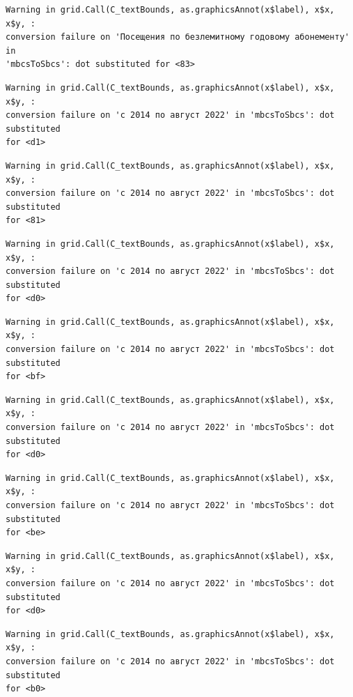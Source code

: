 \documentclass[
  letterpaper,
  DIV=11,
  numbers=noendperiod]{scrartcl}
\begin{document}
\begin{verbatim}
Warning in grid.Call(C_textBounds, as.graphicsAnnot(x$label), x$x, x$y, :
conversion failure on 'Посещения по безлемитному годовому абонементу' in
'mbcsToSbcs': dot substituted for <83>
\end{verbatim}

\begin{verbatim}
Warning in grid.Call(C_textBounds, as.graphicsAnnot(x$label), x$x, x$y, :
conversion failure on 'с 2014 по август 2022' in 'mbcsToSbcs': dot substituted
for <d1>
\end{verbatim}

\begin{verbatim}
Warning in grid.Call(C_textBounds, as.graphicsAnnot(x$label), x$x, x$y, :
conversion failure on 'с 2014 по август 2022' in 'mbcsToSbcs': dot substituted
for <81>
\end{verbatim}

\begin{verbatim}
Warning in grid.Call(C_textBounds, as.graphicsAnnot(x$label), x$x, x$y, :
conversion failure on 'с 2014 по август 2022' in 'mbcsToSbcs': dot substituted
for <d0>
\end{verbatim}

\begin{verbatim}
Warning in grid.Call(C_textBounds, as.graphicsAnnot(x$label), x$x, x$y, :
conversion failure on 'с 2014 по август 2022' in 'mbcsToSbcs': dot substituted
for <bf>
\end{verbatim}

\begin{verbatim}
Warning in grid.Call(C_textBounds, as.graphicsAnnot(x$label), x$x, x$y, :
conversion failure on 'с 2014 по август 2022' in 'mbcsToSbcs': dot substituted
for <d0>
\end{verbatim}

\begin{verbatim}
Warning in grid.Call(C_textBounds, as.graphicsAnnot(x$label), x$x, x$y, :
conversion failure on 'с 2014 по август 2022' in 'mbcsToSbcs': dot substituted
for <be>
\end{verbatim}

\begin{verbatim}
Warning in grid.Call(C_textBounds, as.graphicsAnnot(x$label), x$x, x$y, :
conversion failure on 'с 2014 по август 2022' in 'mbcsToSbcs': dot substituted
for <d0>
\end{verbatim}

\begin{verbatim}
Warning in grid.Call(C_textBounds, as.graphicsAnnot(x$label), x$x, x$y, :
conversion failure on 'с 2014 по август 2022' in 'mbcsToSbcs': dot substituted
for <b0>
\end{verbatim}
\end{document}
